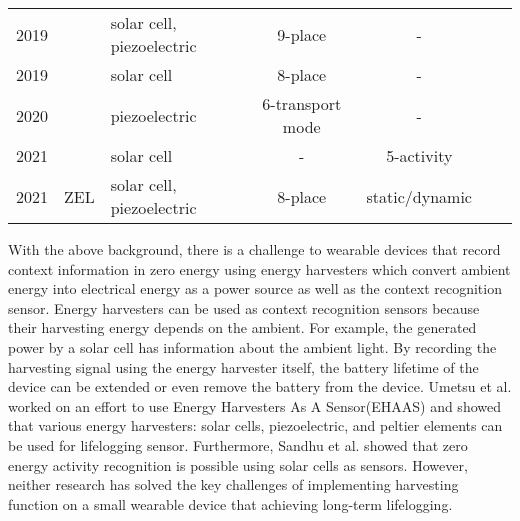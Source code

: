 \documentclass[conference]{IEEEtran}
\newcommand{\cmark}{\ding{51}}%
\newcommand{\xmark}{\ding{55}}%
\begin{document}
\begin{table*}[bt]
\begin{tabular}{lllcccc}
2019 & \cite{umetsu2019ehaas}                  & solar cell, piezoelectric & 9-place          & -                 & \color{red}\xmark  & \color{red}\xmark   \\
2019 & \cite{sugata2019battery}                & solar cell                & 8-place          & -                 & \color{red}\xmark  & \color{red}\xmark   \\
2020 & \cite{sandhu2020towards}                & piezoelectric             & 6-transport mode & -                 & \color{red}\xmark  & \color{red}\xmark   \\
2021 & \cite{Sandhu2021SolAREP}                & solar cell                & -                & 5-activity        & \color{green}\cmark& \color{red}\xmark   \\ 
2021 & ZEL                                     & solar cell, piezoelectric & 8-place          & static/dynamic    & \color{green}\cmark& \color{green}\cmark \\ 
\hline
\end{tabular}
\label{tab:related_work}
\end{table*}

With the above background, there is a challenge to wearable devices that record context information in zero energy using energy harvesters which convert ambient energy into electrical energy as a power source as well as the context recognition sensor.
Energy harvesters can be used as context recognition sensors because their harvesting energy depends on the ambient.
For example, the generated power by a solar cell has information about the ambient light.
By recording the harvesting signal using the energy harvester itself, the battery lifetime of the device can be extended or even remove the battery from the device.
Umetsu et al.\cite{umetsu2019ehaas} worked on an effort to use Energy Harvesters As A Sensor(EHAAS) and showed that various energy harvesters: solar cells, piezoelectric, and peltier elements can be used for lifelogging sensor.
Furthermore, Sandhu et al.\cite{Sandhu2021SolAREP} showed that zero energy activity recognition is possible using solar cells as sensors.
However, neither research has solved the key challenges of implementing harvesting function on a small wearable device that achieving long-term lifelogging.
\end{document}
